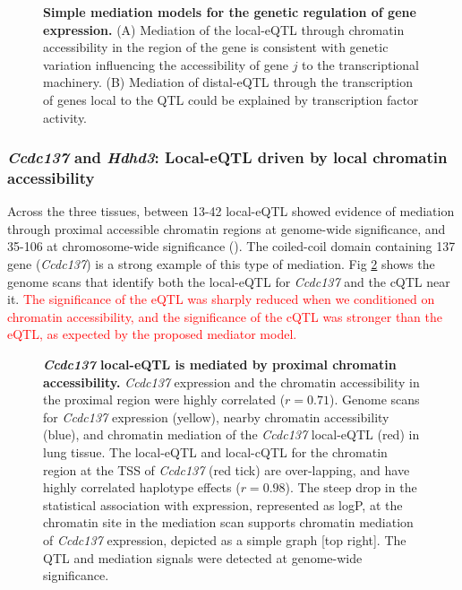 \documentclass[10pt,letterpaper]{article}
\newcommand{\WVinline}[1]{\textcolor{red}{#1}}
\begin{document}
\begin{figure}[h!]
\caption{{\bf Simple mediation models for the genetic regulation of gene expression.} 
(A) Mediation of the local-eQTL through chromatin accessibility in the region of the gene is consistent with genetic variation influencing the accessibility of gene $j$ to the transcriptional machinery. (B) Mediation of distal-eQTL through the transcription of genes local to the QTL could be explained by transcription factor activity.
\label{fig:graph}}
\end{figure}

\subsubsection*{\textit{Ccdc137} and \textit{Hdhd3}: Local-eQTL driven by local chromatin accessibility}
Across the three tissues, between 13-42 local-eQTL showed evidence of mediation through proximal accessible chromatin regions at genome-wide significance, and 35-106 at chromosome-wide significance ().
The coiled-coil domain containing 137 gene (\textit{Ccdc137}) is a strong example of this type of mediation. Fig \ref{fig:ccdc137_mediation} shows the genome scans that identify both the local-eQTL for \textit{Ccdc137} and the cQTL near it. 
\WVinline{The significance of the eQTL was sharply reduced when we conditioned on chromatin accessibility, and the significance of the cQTL was stronger than the eQTL, as expected by the proposed mediator model.}

\begin{figure}[h!]
\caption{\textbf{\textit{Ccdc137} local-eQTL is mediated by proximal chromatin accessibility.} \textit{Ccdc137} expression and the chromatin accessibility in the proximal region were highly correlated ($r = 0.71$). Genome scans for \textit{Ccdc137} expression (yellow), nearby chromatin accessibility (blue), and chromatin mediation of the \textit{Ccdc137} local-eQTL (red) in lung tissue. The local-eQTL and local-cQTL for the chromatin region at the TSS of \textit{Ccdc137} (red tick) are over-lapping, and have highly correlated haplotype effects ($r = 0.98$). The steep drop in the statistical association with expression, represented as logP, at the chromatin site in the mediation scan supports chromatin mediation of \textit{Ccdc137} expression, depicted as a simple graph [top right]. The QTL and mediation signals were detected at genome-wide significance. \label{fig:ccdc137_mediation}}
\end{figure}
\end{document}
